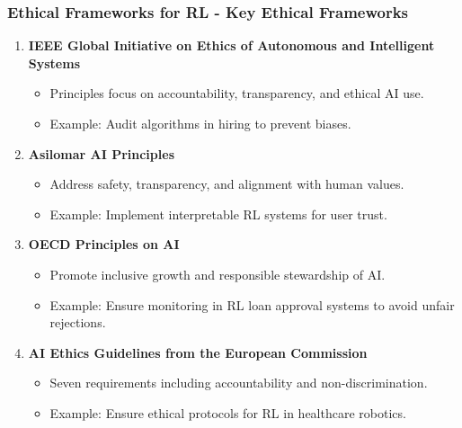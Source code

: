 \documentclass[aspectratio=169]{beamer}
\begin{document}
\begin{frame}[fragile]
    \frametitle{Ethical Frameworks for RL - Key Ethical Frameworks}
    \begin{enumerate}
        \item \textbf{IEEE Global Initiative on Ethics of Autonomous and Intelligent Systems}
            \begin{itemize}
                \item Principles focus on accountability, transparency, and ethical AI use.
                \item Example: Audit algorithms in hiring to prevent biases.
            \end{itemize}
        \item \textbf{Asilomar AI Principles}
            \begin{itemize}
                \item Address safety, transparency, and alignment with human values.
                \item Example: Implement interpretable RL systems for user trust.
            \end{itemize}
        \item \textbf{OECD Principles on AI}
            \begin{itemize}
                \item Promote inclusive growth and responsible stewardship of AI.
                \item Example: Ensure monitoring in RL loan approval systems to avoid unfair rejections.
            \end{itemize}
        \item \textbf{AI Ethics Guidelines from the European Commission}
            \begin{itemize}
                \item Seven requirements including accountability and non-discrimination.
                \item Example: Ensure ethical protocols for RL in healthcare robotics.
            \end{itemize}
    \end{enumerate}
\end{frame}
\end{document}
